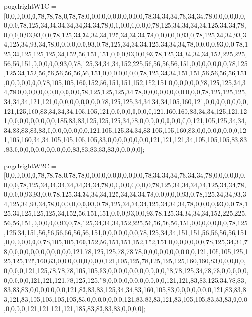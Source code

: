 pogelrightW1C = [0,0,0,0,0,0,78,78,78,0,78,78,0,0,0,0,0,0,0,0,0,0,0,78,34,34,34,78,34,34,78,0,0,0,0,0,0,0,0,0,78,125,34,34,34,34,34,34,34,78,0,0,0,0,0,0,0,0,78,125,34,34,34,34,125,34,34,78,0,0,0,0,93,93,0,0,78,125,34,34,34,34,125,34,34,34,78,0,0,0,0,0,93,0,78,125,34,34,93,34,125,34,93,34,78,0,0,0,0,0,0,93,0,78,125,34,34,34,125,34,34,34,78,0,0,0,0,93,0,0,78,125,34,125,125,125,34,152,56,151,151,0,0,0,93,0,0,93,78,125,34,34,34,34,152,225,225,56,56,151,0,0,0,0,0,93,0,78,125,34,34,34,152,225,56,56,56,56,151,0,0,0,0,0,0,0,78,125,125,34,152,56,56,56,56,56,56,151,0,0,0,0,0,0,0,78,125,34,34,151,151,56,56,56,56,151,0,0,0,0,0,0,0,78,105,105,160,152,56,151,151,152,152,151,0,0,0,0,0,0,78,125,125,34,34,78,0,0,0,0,0,0,0,0,0,0,0,0,78,125,125,125,34,78,0,0,0,0,0,0,0,0,0,0,0,78,125,125,125,34,34,34,121,121,0,0,0,0,0,0,0,0,0,78,125,125,34,34,34,34,105,160,121,0,0,0,0,0,0,0,0,121,125,160,83,34,34,34,105,105,121,0,0,0,0,0,0,0,0,121,160,160,83,34,34,125,121,121,0,0,0,0,0,0,0,0,0,185,83,83,125,125,125,34,78,0,0,0,0,0,0,0,0,0,0,121,105,125,34,34,34,83,83,83,83,0,0,0,0,0,0,0,0,121,105,125,34,34,83,105,105,160,83,0,0,0,0,0,0,0,0,121,105,160,34,34,105,105,105,105,83,0,0,0,0,0,0,0,0,121,121,121,34,105,105,105,83,83,83,0,0,0,0,0,0,0,0,0,0,0,83,83,83,83,83,0,0,0,0,0];

pogelrightW2C = [0,0,0,0,0,0,78,78,78,0,78,78,0,0,0,0,0,0,0,0,0,0,0,78,34,34,34,78,34,34,78,0,0,0,0,0,0,0,0,0,78,125,34,34,34,34,34,34,34,78,0,0,0,0,0,0,0,0,78,125,34,34,34,34,125,34,34,78,0,0,0,0,93,93,0,0,78,125,34,34,34,34,125,34,34,34,78,0,0,0,0,0,93,0,78,125,34,34,93,34,125,34,93,34,78,0,0,0,0,0,0,93,0,78,125,34,34,34,125,34,34,34,78,0,0,0,0,93,0,0,78,125,34,125,125,125,34,152,56,151,151,0,0,0,93,0,0,93,78,125,34,34,34,34,152,225,225,56,56,151,0,0,0,0,0,93,0,78,125,34,34,34,152,225,56,56,56,56,151,0,0,0,0,0,0,0,78,125,125,34,151,56,56,56,56,56,56,151,0,0,0,0,0,0,0,78,125,34,34,151,151,56,56,56,56,151,0,0,0,0,0,0,0,78,105,105,160,152,56,151,151,152,152,151,0,0,0,0,0,0,0,78,125,34,34,78,0,0,0,0,0,0,0,0,0,0,0,0,121,78,125,125,78,78,78,0,0,0,0,0,0,0,0,0,0,121,105,105,125,125,125,125,160,83,0,0,0,0,0,0,0,0,0,121,105,125,78,125,125,125,160,160,83,0,0,0,0,0,0,0,0,0,121,125,78,78,78,105,105,83,0,0,0,0,0,0,0,0,0,0,0,78,78,125,34,78,78,0,0,0,0,0,0,0,0,0,0,121,121,121,78,125,125,78,0,0,0,0,0,0,0,0,0,0,0,121,121,83,83,125,34,78,83,83,83,83,0,0,0,0,0,0,0,121,83,83,83,125,34,34,83,160,105,83,0,0,0,0,0,0,0,121,83,83,83,121,83,105,105,105,105,83,0,0,0,0,0,0,0,121,83,83,83,121,83,105,105,83,83,83,0,0,0,0,0,0,0,121,121,121,121,185,83,83,83,83,0,0,0,0];

